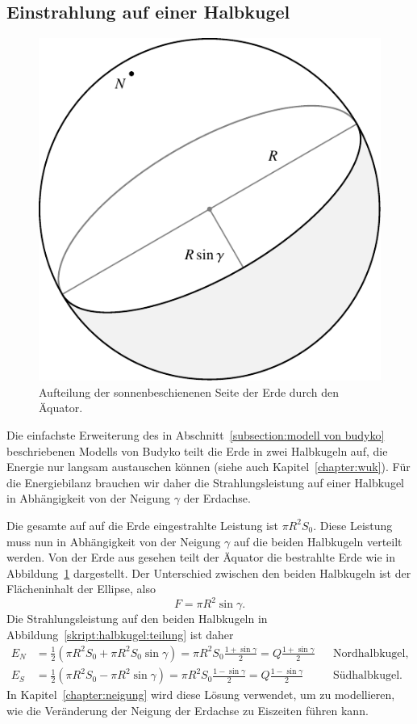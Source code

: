 %
%
%
\subsection{Einstrahlung auf einer Halbkugel\label{subsection:halbkugel}}
\begin{figure}
\centering
\includegraphics{chapters/5/halb.pdf}
\caption{Aufteilung der sonnenbeschienenen Seite der Erde durch den
Äquator.
\label{skript:halbkugel:teilung}}
\end{figure}%
Die einfachste Erweiterung des
in Abschnitt~\ref{subsection:modell von budyko} beschriebenen
Modells von Budyko teilt die
Erde in zwei Halbkugeln auf, die Energie nur langsam austauschen
können (siehe auch Kapitel~\ref{chapter:wuk}).
Für die Energiebilanz brauchen wir daher die Strahlungsleistung
auf einer Halbkugel in Abhängigkeit von der Neigung $\gamma$ der
Erdachse.

Die gesamte auf auf die Erde eingestrahlte Leistung ist $\pi R^2S_0$.
Diese Leistung muss nun in Abhängigkeit von der Neigung $\gamma$
auf die beiden Halbkugeln verteilt werden.
Von der Erde aus gesehen teilt der Äquator die bestrahlte Erde wie
in Abbildung~\ref{skript:halbkugel:teilung} dargestellt.
Der Unterschied zwischen den beiden Halbkugeln ist der Flächeninhalt
der Ellipse, also
\[
F=\pi R^2\sin\gamma.
\]
Die Strahlungsleistung auf den beiden Halbkugeln in
Abbildung~\eqref{skript:halbkugel:teilung} ist daher
\begin{align}
E_N
&= 
\frac12(\pi R^2 S_0 +\pi R^2S_0\sin\gamma)
=
\pi R^2S_0 \frac{1+\sin\gamma}2 = Q\frac{1+\sin\gamma}2
&&\text{Nordhalbkugel,}
\\
E_S
&= 
\frac12(\pi R^2 S_0 -\pi R^2\sin\gamma)
=
\pi R^2S_0 \frac{1-\sin\gamma}2 = Q\frac{1-\sin\gamma}2
&&\text{Südhalbkugel.}
\end{align}
In Kapitel~\ref{chapter:neigung} wird diese Lösung verwendet, um zu
modellieren, wie die Veränderung der Neigung der Erdachse zu Eiszeiten
führen kann.




